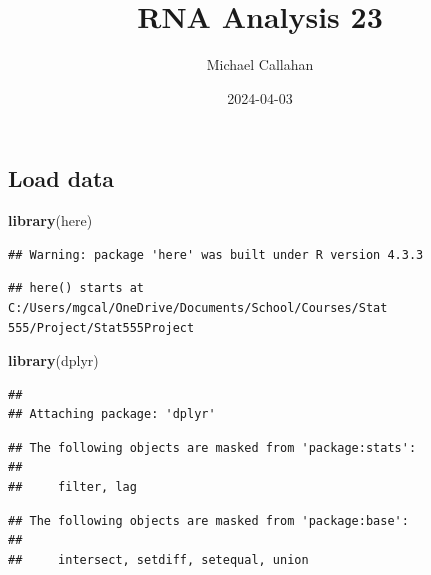 \documentclass[
]{article}
\title{RNA Analysis 23}
\author{Michael Callahan}
\date{2024-04-03}
\newenvironment{Shaded}{\begin{snugshade}}{\end{snugshade}}
\newcommand{\FunctionTok}[1]{\textcolor[rgb]{0.13,0.29,0.53}{\textbf{#1}}}
\newcommand{\NormalTok}[1]{#1}
\begin{document}
\maketitle

\hypertarget{load-data}{%
\subsection{Load data}\label{load-data}}

\begin{Shaded}
\begin{Highlighting}[]
\FunctionTok{library}\NormalTok{(here)}
\end{Highlighting}
\end{Shaded}

\begin{verbatim}
## Warning: package 'here' was built under R version 4.3.3
\end{verbatim}

\begin{verbatim}
## here() starts at C:/Users/mgcal/OneDrive/Documents/School/Courses/Stat 555/Project/Stat555Project
\end{verbatim}

\begin{Shaded}
\begin{Highlighting}[]
\FunctionTok{library}\NormalTok{(dplyr)}
\end{Highlighting}
\end{Shaded}

\begin{verbatim}
## 
## Attaching package: 'dplyr'
\end{verbatim}

\begin{verbatim}
## The following objects are masked from 'package:stats':
## 
##     filter, lag
\end{verbatim}

\begin{verbatim}
## The following objects are masked from 'package:base':
## 
##     intersect, setdiff, setequal, union
\end{verbatim}
\end{document}
